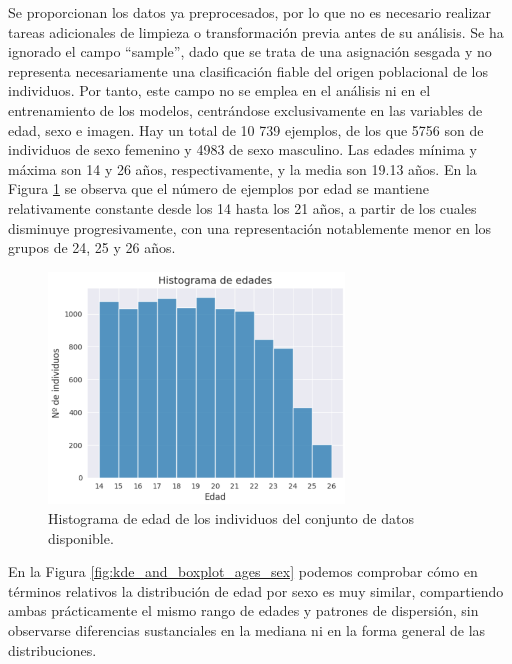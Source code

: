 Se proporcionan los datos ya preprocesados, por lo que no es necesario realizar tareas adicionales de limpieza o transformación previa antes de su análisis. Se ha ignorado el campo ``sample'', dado que se trata de una asignación sesgada y no representa necesariamente una clasificación fiable del origen poblacional de los individuos. Por tanto, este campo no se emplea en el análisis ni en el entrenamiento de los modelos, centrándose exclusivamente en las variables de edad, sexo e imagen.
Hay un total de 10 739 ejemplos, de los que 5756 son de individuos de sexo femenino y 4983 de sexo masculino. Las edades mínima y máxima son 14 y 26 años, respectivamente, y la media son 19.13 años. En la Figura \ref{fig:histogram_ages} se observa que el número de ejemplos por edad se mantiene relativamente constante desde los 14 hasta los 21 años, a partir de los cuales disminuye progresivamente, con una representación notablemente menor en los grupos de 24, 25 y 26 años.
 
\begin{figure}[htbp]
    \centering
    \includegraphics[width=0.7\textwidth]{capitulos/cap_04/imagenes/histogram_ages.png}
    \caption[
        Histograma de edad de los individuos del conjunto de datos disponible.
    ]{
        Histograma de edad de los individuos del conjunto de datos disponible. 
    } 
    \label{fig:histogram_ages}
\end{figure}

En la Figura \ref{fig:kde_and_boxplot_ages_sex} podemos comprobar cómo en términos relativos la distribución de edad por sexo es muy similar, compartiendo ambas prácticamente el mismo rango de edades y patrones de dispersión, sin observarse diferencias sustanciales en la mediana ni en la forma general de las distribuciones.

